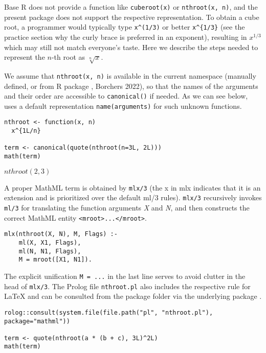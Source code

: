 Base R does not provide a function like \texttt{cuberoot(x)} or \texttt{nthroot(x,\ n)}, and
the present package does not support the respective representation. To obtain a
cube root, a programmer would typically type \texttt{x\^{}(1/3)} or better \texttt{x\^{}\{1/3\}} (see
the practice section why the curly brace is preferred in an exponent), resulting
in \(x^{1/3}\) which may still not match everyone's taste. Here we describe the
steps needed to represent the \(n\)-th root as \(\sqrt[n]x\).

We assume that \texttt{nthroot(x,\ n)} is available in the current
namespace (manually defined, or from R package , Borchers 2022), so that
the names of the arguments and their order are accessible to \texttt{canonical()} if
needed. As we can see below,  uses a default
representation \texttt{name(arguments)} for such unknown functions.

\begin{verbatim}
nthroot <- function(x, n)
  x^{1L/n}

term <- canonical(quote(nthroot(n=3L, 2L)))
math(term)
\end{verbatim}

\(nthroot{\left({2}{{,}{3}}\right)}\)

A proper MathML term is obtained by \texttt{mlx/3} (the x in mlx indicates that it is
an extension and is prioritized over the default ml/3 rules). \texttt{mlx/3}
recursively invokes \texttt{ml/3} for translating the function arguments \emph{X} and \emph{N},
and then constructs the correct MathML entity \texttt{\textless{}mroot\textgreater{}...\textless{}/mroot\textgreater{}}.

\begin{verbatim}
mlx(nthroot(X, N), M, Flags) :-
    ml(X, X1, Flags),
    ml(N, N1, Flags),
    M = mroot([X1, N1]).
\end{verbatim}

The explicit unification \texttt{M\ =\ ...} in the last line serves to avoid clutter in
the head of \texttt{mlx/3}. The Prolog file \texttt{nthroot.pl} also includes the respective
rule for LaTeX and can be consulted from the package folder via the underlying
package .

\begin{verbatim}
rolog::consult(system.file(file.path("pl", "nthroot.pl"), package="mathml"))

term <- quote(nthroot(a * (b + c), 3L)^2L)
math(term)
\end{verbatim}

